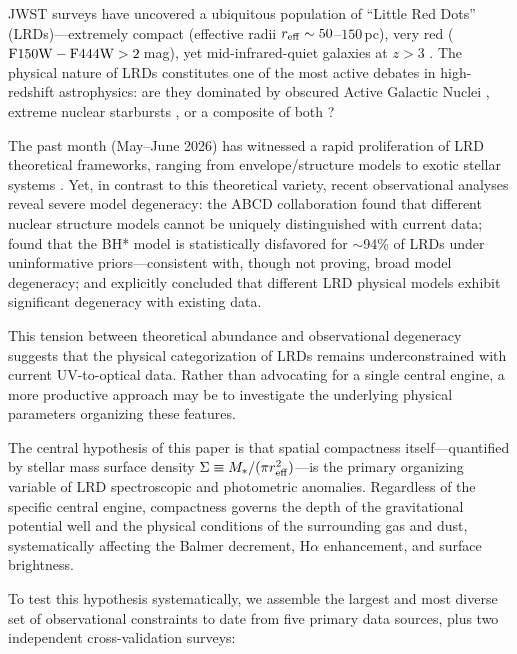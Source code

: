 \documentclass[twocolumn,linenumbers]{aastex631}
\begin{document}
JWST surveys have uncovered a ubiquitous population of ``Little Red Dots'' (LRDs)---extremely compact (effective radii $r_{\rm eff} \sim 50$--$150$\,pc), very red (${\rm F150W}-{\rm F444W} > 2$\,mag), yet mid-infrared-quiet galaxies at $z > 3$ \citep{Harikane2023, Labbe2023, Matthee2024, Greene2024, Barro2024}. The physical nature of LRDs constitutes one of the most active debates in high-redshift astrophysics: are they dominated by obscured Active Galactic Nuclei \citep[AGN;][]{Kocevski2023, Kokorev2024}, extreme nuclear starbursts \citep{Furtak2024}, or a composite of both \citep{Pacucci2024}?

The past month (May--June 2026) has witnessed a rapid proliferation of LRD theoretical frameworks, ranging from envelope/structure models to exotic stellar systems \citep[e.g.,][]{Sneppen2026b, Sharma2026, Takasao2026, ChenMo2026, Ilie2026, Liempi2026}. Yet, in contrast to this theoretical variety, recent observational analyses reveal severe model degeneracy: the ABCD collaboration \citep{Chen2026ABCD} found that different nuclear structure models cannot be uniquely distinguished with current data; \citet{Merida2026} found that the BH* model is statistically disfavored for $\sim$94\% of LRDs under uninformative priors---consistent with, though not proving, broad model degeneracy; and \citet{Gentile2026} explicitly concluded that different LRD physical models exhibit significant degeneracy with existing data.

This tension between theoretical abundance and observational degeneracy suggests that the physical categorization of LRDs remains underconstrained with current UV-to-optical data. Rather than advocating for a single central engine, a more productive approach may be to investigate the underlying physical parameters organizing these features.

The central hypothesis of this paper is that spatial compactness itself---quantified by stellar mass surface density $\Sigma \equiv M_*/(\pi r_{\rm eff}^2)$---is the primary organizing variable of LRD spectroscopic and photometric anomalies. Regardless of the specific central engine, compactness governs the depth of the gravitational potential well and the physical conditions of the surrounding gas and dust, systematically affecting the Balmer decrement, H$\alpha$ enhancement, and surface brightness.

To test this hypothesis systematically, we assemble the largest and most diverse set of observational constraints to date from five primary data sources, plus two independent cross-validation surveys:
\end{document}
